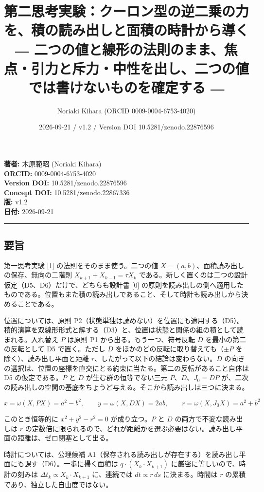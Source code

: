 \documentclass[
  a4paper,
]{ltjsarticle}
\title{第二思考実験：クーロン型の逆二乗の力を、積の読み出しと面積の時計から導く
―
二つの値と線形の法則のまま、焦点・引力と斥力・中性を出し、二つの値では書けないものを確定する
―}
\author{Noriaki Kihara (ORCID 0009-0004-6753-4020)}
\date{2026-09-21 / v1.2 / Version DOI 10.5281/zenodo.22876596}
\begin{document}
\maketitle

\textbf{著者:} 木原範昭 (Noriaki Kihara)\\
\textbf{ORCID:} 0009-0004-6753-4020\\
\textbf{Version DOI:} 10.5281/zenodo.22876596\\
\textbf{Concept DOI:} 10.5281/zenodo.22867336\\
\textbf{版:} v1.2\\
\textbf{日付:} 2026-09-21

\begin{center}\rule{0.5\linewidth}{0.5pt}\end{center}

\subsection{要旨}\label{ux8981ux65e8}

第一思考実験 {[}1{]} の法則をそのまま使う。二つの値
\(X=(a,b)\)、面積読み出しの保存、無向の二階則
\(X_{k+1}+X_{k-1}=\tau X_k\)
である。新しく置くのは二つの設計仮定（D5、D6）だけで、どちらも設計書
{[}0{]}
の原則を読み出しの側へ適用したものである。位置もまた積の読み出しであること、そして時計も読み出しから決めることである。

位置については、原則
P2（状態単独は読めない）を位置にも適用する（D5）。積的演算を双線形形式と解する（D3）と、位置は状態と関係の組の積として読まれる。入れ替え
\(P\) は原則 P1 から出る。もう一つ、符号反転 \(D\)
を最小の第二の反転として D5 で置く。ただし \(D\)
をほかのどの反転に取り替えても（\(\pm P\) を除く）、読み出し平面と距離
\(r\)、したがって以下の結論は変わらない。\(D\)
の向きの選択は、位置の座標を直交にとる約束に当たる。第二の反転があること自体は
D5 の仮定である。\(P\) と \(D\) が生む群の恒等でない三元
\(P\)、\(D\)、\(J_0=DP\)
が、二次の読み出しの空間の基底をちょうど与える。そこから読み出しは三つに決まる。

\[
x=\omega(X,PX)=a^2-b^2,\qquad y=\omega(X,DX)=2ab,\qquad r=\omega(X,J_0X)=a^2+b^2
\]

このとき恒等的に \(x^2+y^2-r^2=0\) が成り立つ。\(P\) と \(D\)
の両方で不変な読み出しは \(r\)
の定数倍に限られるので、どれが距離かを選ぶ必要はない。読み出し平面の距離は、ゼロ閉塞として出る。

時計については、公理候補
A1（保存される読み出しが存在する）を読み出し平面にも課す（D6）。一歩に掃く面積は
\(q\cdot(X_k\cdot X_{k+1})\) に厳密に等しいので、時計の刻みは
\(\Delta t_k\propto X_k\cdot X_{k+1}\) に、連続では \(dt\propto r\,ds\)
に決まる。時間は \(r\) の累積であり、独立した自由度ではない。
\end{document}
